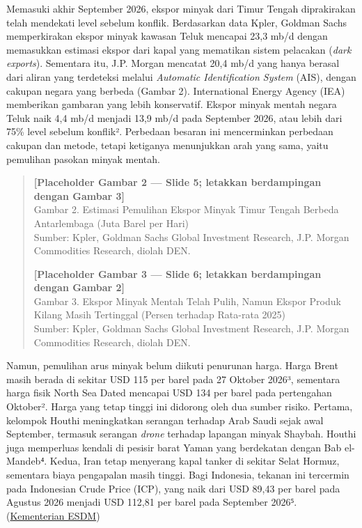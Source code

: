 \documentclass[
  manuscript=article,
  layout=brief,
  year=2026,
  volume=1,
]{den}
\begin{document}
Memasuki akhir September 2026, ekspor minyak dari Timur Tengah
diprakirakan telah mendekati level sebelum konflik. Berdasarkan data
Kpler, Goldman Sachs memperkirakan ekspor minyak kawasan Teluk mencapai
23,3 mb/d dengan memasukkan estimasi ekspor dari kapal yang mematikan
sistem pelacakan (\emph{dark exports}). Sementara itu, J.P. Morgan
mencatat 20,4 mb/d yang hanya berasal dari aliran yang terdeteksi
melalui \emph{Automatic Identification System} (AIS), dengan cakupan
negara yang berbeda (Gambar 2). International Energy Agency (IEA)
memberikan gambaran yang lebih konservatif. Ekspor minyak mentah negara
Teluk naik 4,4 mb/d menjadi 13,9 mb/d pada September 2026, atau lebih
dari 75\% level sebelum konflik². Perbedaan besaran ini mencerminkan
perbedaan cakupan dan metode, tetapi ketiganya menunjukkan arah yang
sama, yaitu pemulihan pasokan minyak mentah.

\begin{quote}
\textbf{{[}Placeholder Gambar 2 --- Slide 5; letakkan berdampingan
dengan Gambar 3{]}}\\
Gambar 2. Estimasi Pemulihan Ekspor Minyak Timur Tengah Berbeda
Antarlembaga (Juta Barel per Hari)\\
Sumber: Kpler, Goldman Sachs Global Investment Research, J.P. Morgan
Commodities Research, diolah DEN.

\textbf{{[}Placeholder Gambar 3 --- Slide 6; letakkan berdampingan
dengan Gambar 2{]}}\\
Gambar 3. Ekspor Minyak Mentah Telah Pulih, Namun Ekspor Produk Kilang
Masih Tertinggal (Persen terhadap Rata-rata 2025)\\
Sumber: Kpler, Goldman Sachs Global Investment Research, J.P. Morgan
Commodities Research, diolah DEN.
\end{quote}

Namun, pemulihan arus minyak belum diikuti penurunan harga. Harga Brent
masih berada di sekitar USD 115 per barel pada 27 Oktober 2026³,
sementara harga fisik North Sea Dated mencapai USD 134 per barel pada
pertengahan Oktober². Harga yang tetap tinggi ini didorong oleh dua
sumber risiko. Pertama, kelompok Houthi meningkatkan serangan terhadap
Arab Saudi sejak awal September, termasuk serangan \emph{drone} terhadap
lapangan minyak Shaybah. Houthi juga memperluas kendali di pesisir barat
Yaman yang berdekatan dengan Bab el-Mandeb⁴. Kedua, Iran tetap menyerang
kapal tanker di sekitar Selat Hormuz, sementara biaya pengapalan masih
tinggi. Bagi Indonesia, tekanan ini tercermin pada Indonesian Crude
Price (ICP), yang naik dari USD 89,43 per barel pada Agustus 2026
menjadi USD 112,81 per barel pada September 2026⁵.
(\href{https://migas.esdm.go.id/post/Tensi-Geopolitik-Memanas-ICP-September-2026-Melonjak-ke-Angka-US-112-81-per-Barel}{Kementerian
ESDM})
\end{document}
